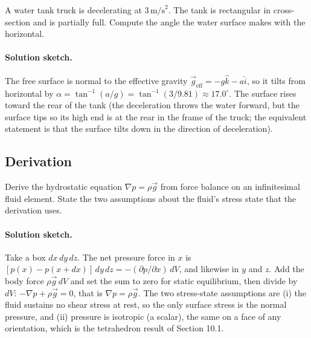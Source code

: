 \begin{exercise}
A water tank truck is decelerating at $3\,\text{m/s}^2$. The tank
is rectangular in cross-section and is partially full. Compute
the angle the water surface makes with the horizontal.

\paragraph{Solution sketch.} The free surface is normal to the
effective gravity $\vec{g}_{\text{eff}} = -g\hat{k} - a\hat{i}$, so it
tilts from horizontal by $\alpha = \tan^{-1}(a/g) = \tan^{-1}(3/9.81)
\approx 17.0^{\circ}$. The surface rises toward the rear of the tank
(the deceleration throws the water forward, but the surface tips so its
high end is at the rear in the frame of the truck; the equivalent
statement is that the surface tilts down in the direction of
deceleration).
\end{exercise}

\subsection*{Derivation}

\begin{exercise}
Derive the hydrostatic equation $\nabla p = \rho \vec{g}$ from
force balance on an infinitesimal fluid element. State the two
assumptions about the fluid's stress state that the derivation
uses.

\paragraph{Solution sketch.} Take a box $dx\,dy\,dz$. The net pressure
force in $x$ is $[p(x) - p(x+dx)]\,dy\,dz = -(\partial p/\partial x)\,
dV$, and likewise in $y$ and $z$. Add the body force $\rho\vec{g}\,dV$
and set the sum to zero for static equilibrium, then divide by $dV$:
$-\nabla p + \rho\vec{g} = 0$, that is $\nabla p = \rho\vec{g}$. The two
stress-state assumptions are (i) the fluid sustains no shear stress at
rest, so the only surface stress is the normal pressure, and (ii)
pressure is isotropic (a scalar), the same on a face of any orientation,
which is the tetrahedron result of Section 10.1.
\end{exercise}

